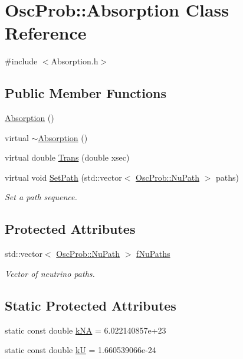 \hypertarget{classOscProb_1_1Absorption}{}\section{Osc\+Prob\+:\+:Absorption Class Reference}
\label{classOscProb_1_1Absorption}


{\ttfamily \#include $<$Absorption.\+h$>$}

\subsection*{Public Member Functions}
\begin{DoxyCompactItemize}
\item 
\hyperlink{classOscProb_1_1Absorption_a425183cbac1b7ea23a0366733d89a239}{Absorption} ()
\item 
virtual \hyperlink{classOscProb_1_1Absorption_ab7221ec8a2f72effbbb420aceca3df60}{$\sim$\+Absorption} ()
\item 
virtual double \hyperlink{classOscProb_1_1Absorption_afe0c4cfc50a6f6434554fbb75c4272ac}{Trans} (double xsec)
\item 
virtual void \hyperlink{classOscProb_1_1Absorption_ad3c552785adac11af8b509fbf355c158}{Set\+Path} (std\+::vector$<$ \hyperlink{structOscProb_1_1NuPath}{Osc\+Prob\+::\+Nu\+Path} $>$ paths)
\begin{DoxyCompactList}\small\item\em Set a path sequence. \end{DoxyCompactList}\end{DoxyCompactItemize}
\subsection*{Protected Attributes}
\begin{DoxyCompactItemize}
\item 
std\+::vector$<$ \hyperlink{structOscProb_1_1NuPath}{Osc\+Prob\+::\+Nu\+Path} $>$ \hyperlink{classOscProb_1_1Absorption_aabe51d0748a0d48972780811e90acf69}{f\+Nu\+Paths}
\begin{DoxyCompactList}\small\item\em Vector of neutrino paths. \end{DoxyCompactList}\end{DoxyCompactItemize}
\subsection*{Static Protected Attributes}
\begin{DoxyCompactItemize}
\item 
static const double \hyperlink{classOscProb_1_1Absorption_a4b3f52bb9c7fffbd55dc9d345375d9b0}{k\+NA} = 6.\+022140857e+23
\item 
static const double \hyperlink{classOscProb_1_1Absorption_ab33e87a30b5761dbf7fca55ee9cb58a7}{kU} = 1.\+660539066e-\/24
\end{DoxyCompactItemize}


